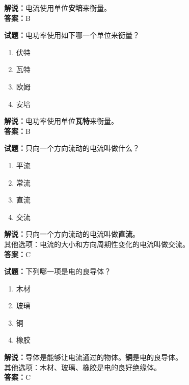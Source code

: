 \documentclass{ctexbook}
\begin{document}
\noindent\textbf{解说：}电流使用单位\textbf{安培}来衡量。\cite[130]{si}\\
\noindent\textbf{答案：}B

\bigskip

\noindent\textbf{试题：}电功率使用如下哪一个单位来衡量？

\begin{enumerate}[leftmargin=3em]
  \item 伏特
  \item 瓦特
  \item 欧姆
  \item 安培
\end{enumerate}

\noindent\textbf{解说：}电功率使用单位\textbf{瓦特}来衡量。\cite[137]{si}\\
\noindent\textbf{答案：}B

\bigskip

\noindent\textbf{试题：}只向一个方向流动的电流叫做什么？

\begin{enumerate}[leftmargin=3em]
  \item 平流
  \item 常流
  \item 直流
  \item 交流
\end{enumerate}

\noindent\textbf{解说：}只向一个方向流动的电流叫做\textbf{直流}。\\
其他选项：电流的大小和方向周期性变化的电流叫做交流。\\
\noindent\textbf{答案：}C

\bigskip

\noindent\textbf{试题：}下列哪一项是电的良导体？

\begin{enumerate}[leftmargin=3em]
  \item 木材
  \item 玻璃
  \item 铜
  \item 橡胶
\end{enumerate}

\noindent\textbf{解说：}导体是能够让电流通过的物体。\textbf{铜}是电的良导体。\cite{Resistivity_and_conductivity_of_various_materials}\\
其他选项：木材、玻璃、橡胶是电的良好绝缘体。\\
\noindent\textbf{答案：}C

\bigskip
\end{document}

